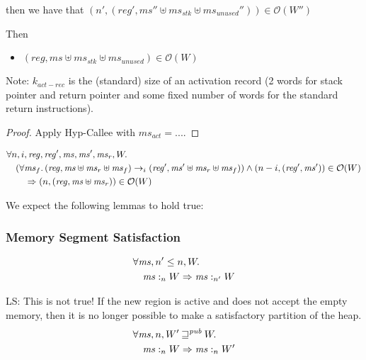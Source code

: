 \documentclass[a4paper]{article}
\newcommand\lau[1]{{\color{purple} \sf \footnotesize {LS: #1}}\\}
\newcommand{\var}[1]{\mathit{#1}}
\newcommand{\hs}{\var{ms}}
\newcommand{\ms}{\hs}
\newcommand{\reg}{\var{reg}}
\newcommand{\heap}{\var{mem}}
\newcommand{\stk}{\var{stk}}
\newcommand{\futurewk}{\mathbin{\sqsupseteq}^{\var{pub}}}
\newcommand{\heapSat}[3][\heap]{#1 :_{#2} #3}
\newcommand{\observations}{\mathcal{O}}
\newcommand{\npair}[2][n]{\left(#1,#2 \right)}
\newcommand{\step}[1][]{\rightarrow_{#1}}
\begin{document}
\begin{lemma}
\begin{itemize}
    then we have that $(n', (\reg',\ms'' \uplus \ms_\stk \uplus \ms_{\var{unused}}'')) \in \observations(W'')$
  \end{itemize}
  Then 
  \begin{itemize}
    \item $(\reg,\ms \uplus \ms_\stk \uplus \ms_{\var{unused}}) \in \observations(W)$
  \end{itemize}

  Note: $k_{\mathit{act-rec}}$ is the (standard) size of an activation record (2
  words for stack pointer and return pointer and some fixed number of words for
  the standard return instructions).
\end{lemma}
\begin{proof}
  Apply Hyp-Callee with $\ms_{\mathit{act}} = ...$. 
\end{proof}

\begin{lemma}[Execution and $\observations$]
  \begin{align*}
    & \forall n,i,\reg, \reg', \ms, \ms', \ms_r, W \ldotp\\
    & \quad (\forall \ms_f \ldotp (\reg,\ms \uplus \ms_r \uplus \ms_f) \step[i] (\reg',\ms' \uplus \ms_r \uplus \ms_f)) \land \npair[n-i]{(\reg',\ms')} \in \observations(W) \\
    & \qquad \Rightarrow \npair{(\reg,\ms \uplus \ms_r)} \in \observations(W)
  \end{align*}

\end{lemma}

We expect the following lemmas to hold true:
\subsubsection{Memory Segment Satisfaction}
\begin{lemma}
  \begin{align*}
    &\forall \hs, n' \leq n, W \ldotp \\
    &\quad \heapSat[\hs]{n}{W} \Rightarrow \heapSat[\hs]{n'}{W}
  \end{align*}
\end{lemma} 

\begin{lemma}
  \lau{This is not true! If the new region is active and does not accept the empty memory, then it is no longer possible to make a satisfactory partition of the heap.}
  \begin{align*}
    & \forall \hs, n, W' \futurewk W \ldotp \\
    & \quad \heapSat[\hs]{n}{W} \Rightarrow \heapSat[\hs]{n}{W'}
  \end{align*}
\end{lemma}
\end{document}
